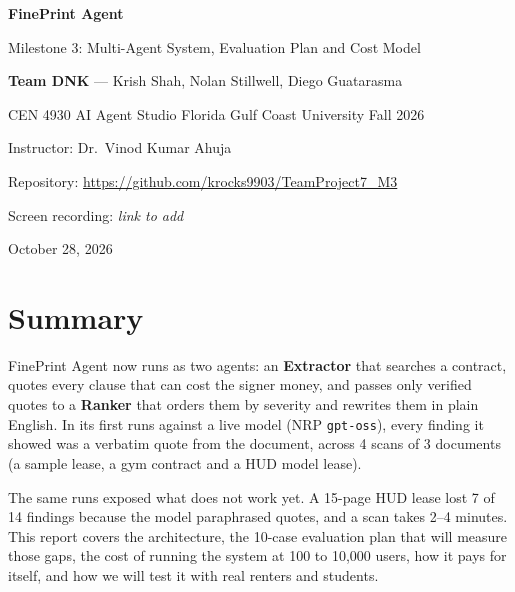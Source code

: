 \documentclass[11pt,letterpaper]{article}
\newcommand{\code}[1]{\texttt{#1}}
\begin{document}
\begin{titlepage}
\centering
\vspace*{3cm}
{\Huge\bfseries FinePrint Agent\par}
\vspace{0.6cm}
{\Large Milestone 3: Multi-Agent System, Evaluation Plan and Cost Model\par}
\vspace{1.5cm}
{\large \textbf{Team DNK} --- Krish Shah, Nolan Stillwell, Diego Guatarasma\par}
\vspace{0.4cm}
{CEN 4930 AI Agent Studio \textperiodcentered{} Florida Gulf Coast University \textperiodcentered{} Fall 2026\par}
{Instructor: Dr.\ Vinod Kumar Ahuja\par}
\vspace{1.5cm}
{Repository: \url{https://github.com/krocks9903/TeamProject7_M3}\par}
{Screen recording: \textit{link to add}\par}
\vfill
{October 28, 2026\par}
\end{titlepage}

\tableofcontents
\newpage

\section{Summary}

FinePrint Agent now runs as two agents: an \textbf{Extractor} that searches a contract, quotes every clause that can cost the signer money, and passes only verified quotes to a \textbf{Ranker} that orders them by severity and rewrites them in plain English. In its first runs against a live model (NRP \code{gpt-oss}), every finding it showed was a verbatim quote from the document, across 4 scans of 3 documents (a sample lease, a gym contract and a HUD model lease).

The same runs exposed what does not work yet. A 15-page HUD lease lost 7 of 14 findings because the model paraphrased quotes, and a scan takes 2--4 minutes. This report covers the architecture, the 10-case evaluation plan that will measure those gaps, the cost of running the system at 100 to 10,000 users, how it pays for itself, and how we will test it with real renters and students.
\end{document}
